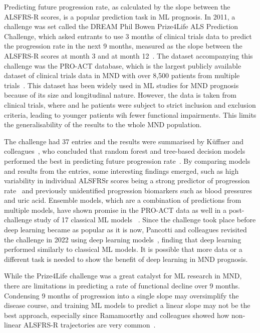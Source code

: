 Predicting future progression rate, as calculated by the slope between the ALSFRS-R scores, is a popular prediction task in ML prognosis.
In 2011, a challenge was set called the DREAM Phil Bowen Prize4Life ALS Prediction Challenge, which asked entrants to use 3 months of clinical trials data to predict the progression rate in the next 9 months, measured as the slope between the ALSFRS-R scores at month 3 and at month 12~\cite{kuffnerCrowdsourcedAnalysisClinical2015}.
The dataset accompanying this challenge was the PRO-ACT database, which is the largest publicly available dataset of clinical trials data in MND with over 8,500 patients from multiple trials~\cite{atassiPROACTDatabaseDesign2014}.
This dataset has been widely used in ML studies for MND prognosis because of its size and longitudinal nature.
However, the data is taken from clinical trials, where and he patients were subject to strict inclusion and exclusion criteria, leading to younger patients wih fewer functional impairments.
This limits the generalisability of the results to the whole MND population.

The challenge had 37 entries and the results were summarised by Küffner and colleagues~\cite{kuffnerCrowdsourcedAnalysisClinical2015}, who concluded that random forest and tree-based decision models performed the best in predicting future progression rate~\cite{hothornRandomForest4LifeRandomForest2014}.
By comparing models and results from the entries, some interesting findings emerged, such as high variability in individual ALSFRSr scores being a strong predictor of progression rate~\cite{hothornRandomForest4LifeRandomForest2014} and previously unidentified progression biomarkers such as blood pressures and uric acid.
Ensemble models, which are a combination of predictions from multiple models, have shown promise in the PRO-ACT data as well in a post-challenge study of 17 classical ML models ~\cite{turabiehMachineLearningEmpowered2024}.
Since the challenge took place before deep learning became as popular as it is now, Pancotti and colleagues revisited the challenge in 2022 using deep learning models~\cite{pancottiDeepLearningMethods2022}, finding that deep learning performed similarly to classical ML models.
It is possible that more data or a different task is needed to show the benefit of deep learning in MND prognosis.

While the Prize4Life challenge was a great catalyst for ML research in MND, there are limitations in predicting a rate of functional decline over 9 months.
Condensing 9 months of progression into a single slope may oversimplify the disease course, and training ML models to predict a linear slope may not be the best approach, especially since Ramamoorthy and colleagues showed how non-linear ALSFRS-R trajectories are very common~\cite{ramamoorthyIdentifyingPatternsAmyotrophic2022}.

